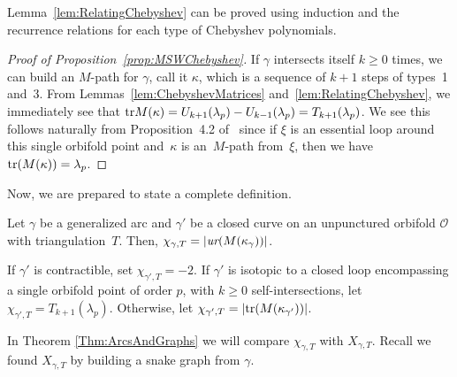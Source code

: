Lemma~\ref{lem:RelatingChebyshev} can be proved using induction and the recurrence relations for each type of Chebyshev polynomials.

\begin{proof}[Proof of Proposition~\ref{prop:MSWChebyshev}]
If $\gamma$ intersects itself $k \geq 0$ times, we can build an $M$-path for $\gamma$, call it $\kappa$, which is a sequence of $k+1$ steps of types~1 and~3. From Lemmas~\ref{lem:ChebyshevMatrices} and~\ref{lem:RelatingChebyshev}, we immediately see that ${\rm tr}M(\kappa) = U_{k+1}(\lambda_p) - U_{k-1}(\lambda_p) = T_{k+1}(\lambda_p)$. We see this follows naturally from Proposition~4.2 of~\cite{MSW-bases} since if $\xi$ is an essential loop around this single orbifold point and~$\kappa$ is an~$M$-path from~$\xi$, then we have ${\rm tr}(M(\kappa)) = \lambda_p$.
\end{proof}

Now, we are prepared to state a complete definition.

\begin{Definition}\label{def:chi_gamma}
Let $\gamma$ be a generalized arc and $\gamma'$ be a closed curve on an unpunctured orbifold $\mathcal{O}$ with triangulation~$T$. Then, $\chi_{\gamma,T} = \vert \emph{ur} (M(\kappa_\gamma)) \vert$.

If $\gamma'$ is contractible, set $\chi_{\gamma',T} = -2$. If $\gamma'$ is isotopic to a closed loop encompassing a single orbifold point of order $p$, with $k \geq 0$ self-intersections, let $\chi_{\gamma',T} = T_{k+1}(\lambda_p)$. Otherwise, let $\chi_{\gamma',T} = \vert {\rm tr} (M(\kappa_{\gamma'})) \vert$.
\end{Definition}

In Theorem \ref{Thm:ArcsAndGraphs} we will compare $\chi_{\gamma,T}$ with $X_{\gamma,T}$. Recall we found $X_{\gamma,T}$ by building a snake graph from $\gamma$.

